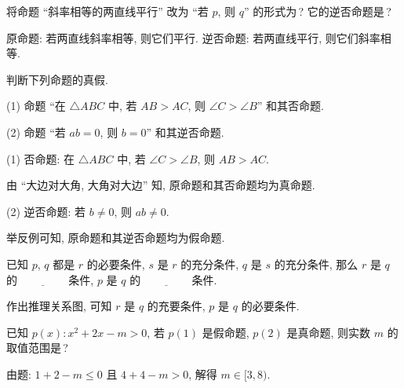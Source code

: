   \lianxi
  \begin{exercise}
    将命题 ``斜率相等的两直线平行'' 改为 ``若 $p$, 则 $q$'' 的形式为\,? 
    它的逆否命题是\,?
  \end{exercise}
  
  \beginsolution
    原命题: 若两直线斜率相等, 则它们平行. 逆否命题: 若两直线平行, 则它们斜率相等.
  \endsolution
  
  \begin{exercise}
    判断下列命题的真假.
    
    (1) 命题 ``在 $\triangle ABC$ 中, 若 $AB>AC$, 则 $\angle C>\angle B$'' 和其否命题.
    
    (2) 命题 ``若 $ab=0$, 则 $b=0$'' 和其逆否命题.
  \end{exercise}

  \beginsolution
    (1) 否命题: 在 $\triangle ABC$ 中, 若 $\angle C>\angle B$, 则 $AB>AC$.
    
    由 ``大边对大角, 大角对大边'' 知, 原命题和其否命题均为真命题.
    
    (2) 逆否命题: 若 $b\neq 0$, 则 $ab\neq 0$.
    
    举反例可知, 原命题和其逆否命题均为假命题.
  \endsolution
  
  \begin{exercise}
    已知 $p$, $q$ 都是 $r$ 的必要条件, $s$ 是 $r$ 的充分条件, 
    $q$ 是 $s$ 的充分条件, 
    那么 $r$ 是 $q$ 的 $\underline{\qquad\qquad}$ 条件, 
    $p$ 是 $q$ 的 $\underline{\qquad\qquad}$ 条件.
  \end{exercise}

  \beginsolution
    作出推理关系图, 
  可知 $r$ 是 $q$ 的充要条件, $p$ 是 $q$ 的必要条件.
  \endsolution
  
  \begin{exercise}
    已知 $p(x)\colon x^2 +2x-m>0$, 若 $p(1)$ 是假命题, $p(2)$ 是真命题,
    则实数 $m$ 的取值范围是\,?
  \end{exercise}

  \beginsolution
    由题: $1+2-m\leqslant 0$ 且 $4+4-m>0$, 解得 $m\in[3,8)$.
  \endsolution

